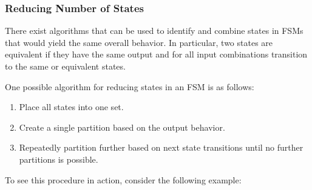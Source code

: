 \subsubsection{Reducing Number of States}
There exist algorithms that can be used to identify and combine states in FSMs that would yield the same overall behavior. In particular, two states are equivalent if they have the same output and for all input combinations transition to the same or equivalent states.

One possible algorithm for reducing states in an FSM is as follows:
\begin{enumerate}
    \item Place all states into one set.
    \item Create a single partition based on the output behavior.
    \item Repeatedly partition further based on next state transitions until no further partitions is possible.
\end{enumerate}
To see this procedure in action, consider the following example:

